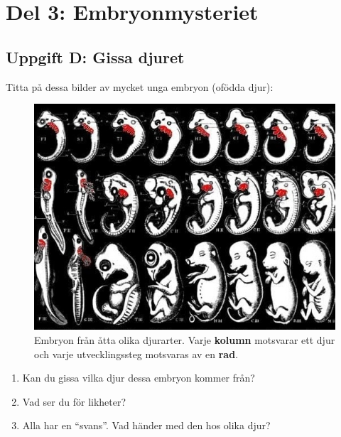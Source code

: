 \documentclass[a4paper,11pt]{article}
\begin{document}
\section{Del 3: Embryonmysteriet}

\subsection{Uppgift D: Gissa djuret}

Titta på dessa bilder av mycket unga embryon (ofödda djur):

\begin{figure}[H]
\centering
\includegraphics[width=1\textwidth]{embryo-drawings.jpg}
\caption{Embryon från åtta olika djurarter. Varje \textbf{kolumn} motsvarar ett djur och varje utvecklingssteg motsvaras av en \textbf{rad}.}
\end{figure}
\begin{enumerate}
    \item Kan du gissa vilka djur dessa embryon kommer från?
    
    \vspace{2cm}
    
    \item Vad ser du för likheter?
    
    \vspace{2cm}
    
    \item Alla har en ``svans''. Vad händer med den hos olika djur?
\end{enumerate}
\end{document}
